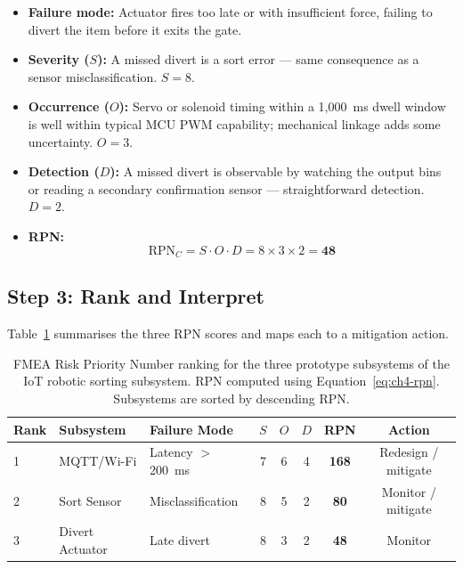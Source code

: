 \begin{itemize}
  \item \textbf{Failure mode:} Actuator fires too late or with insufficient force, failing to divert the item before it exits the gate.
  \item \textbf{Severity ($S$):} A missed divert is a sort error — same consequence as a sensor misclassification. \textbf{$S = 8$}.
  \item \textbf{Occurrence ($O$):} Servo or solenoid timing within a 1{,}000~ms dwell window is well within typical MCU PWM capability; mechanical linkage adds some uncertainty. \textbf{$O = 3$}.
  \item \textbf{Detection ($D$):} A missed divert is observable by watching the output bins or reading a secondary confirmation sensor — straightforward detection. \textbf{$D = 2$}.
  \item \textbf{RPN:}
        \[
          \text{RPN}_C = S \cdot O \cdot D = 8 \times 3 \times 2 = \mathbf{48}
        \]
\end{itemize}

\subsection{Step 3: Rank and Interpret}
\label{subsec:ch4-step3}

Table~\ref{tab:ch4-rpn} summarises the three RPN scores and maps each to a mitigation action.

\begin{table}[htbp]
  \centering
  \caption{FMEA Risk Priority Number ranking for the three prototype subsystems of the IoT robotic sorting subsystem.
           RPN computed using Equation~\eqref{eq:ch4-rpn}.
           Subsystems are sorted by descending RPN.}
  \label{tab:ch4-rpn}
  \begin{tabular}{@{}lllccccc@{}}
    \toprule
    Rank & Subsystem & Failure Mode & $S$ & $O$ & $D$ & RPN & Action \\
    \midrule
    1 & MQTT/Wi-Fi & Latency $>$200~ms  & 7 & 6 & 4 & \textbf{168} & Redesign / mitigate \\
    2 & Sort Sensor & Misclassification  & 8 & 5 & 2 & \textbf{80}  & Monitor / mitigate  \\
    3 & Divert Actuator & Late divert   & 8 & 3 & 2 & \textbf{48}  & Monitor             \\
    \bottomrule
  \end{tabular}
\end{table}

